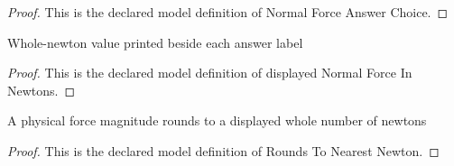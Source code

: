 \begin{proof}
  This is the declared model definition of Normal Force Answer Choice.
\end{proof}
\begin{definition}
  \label{def:physics:phyx-mini-0762:phyxminiproblems-problemphyxmini0762-displayednormalforceinnewtons}
  Whole-newton value printed beside each answer label
\end{definition}
\begin{proof}
  This is the declared model definition of displayed Normal Force In Newtons.
\end{proof}
\begin{definition}
  \label{def:physics:phyx-mini-0762:phyxminiproblems-problemphyxmini0762-roundstonearestnewton}
  A physical force magnitude rounds to a displayed whole number of newtons
\end{definition}
\begin{proof}
  This is the declared model definition of Rounds To Nearest Newton.
\end{proof}
